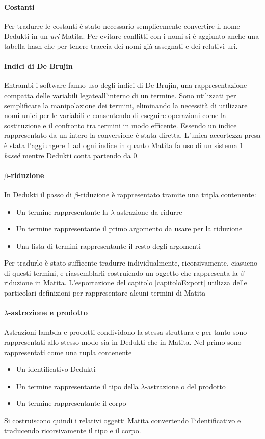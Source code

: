 \documentclass[12pt,a4paper]{report}
\begin{document}
\paragraph{Costanti}
Per tradurre le costanti è stato necessario semplicemente convertire il nome
Dedukti in un \textit{uri} Matita. Per evitare conflitti con i nomi si è aggiunto
anche una tabella hash che per tenere traccia dei nomi già assegnati e dei 
relativi uri.

\paragraph{Indici di De Brujin}
Entrambi i software fanno uso degli indici di De Brujin, una rappresentazione
compatta delle variabili legateall'interno di un termine. Sono utilizzati per
semplificare la manipolazione dei termini, eliminando la necessità di utilizzare
nomi unici per le variabili e consentendo di eseguire operazioni come la 
sostituzione e il confronto tra termini in modo efficente. 
Essendo un indice rappresentato da un intero la conversione è stata diretta.
L'unica accortezza presa è stata l'aggiungere $1$ ad ogni indice in quanto
Matita fa uso di un sistema \textit{$1$ based} mentre Dedukti conta partendo
da $0$.

\paragraph{$\beta$-riduzione}
In Dedukti il passo di $\beta$-riduzione è rappresentato tramite una tripla
contenente: 
\begin{itemize}
  \item Un termine rappresentante la $\lambda$ astrazione da ridurre
  \item Un termine rappresentante il primo argomento da usare per la riduzione
  \item Una lista di termini rappresentante il resto degli argomenti
\end{itemize}
Per tradurlo è stato sufficente tradurre individualmente, ricorsivamente, ciasucno
di questi termini, e riassemblarli costruiendo un oggetto che rappresenta la 
$\beta$-riduzione in Matita. 
L'esportazione del capitolo \ref{capitoloExport} utilizza delle particolari
definizioni per rappresentare alcuni termini di Matita %

\paragraph{$\lambda$-astrazione e prodotto}
Astrazioni lambda e prodotti condividono la stessa struttura e per tanto sono
rappresentati allo stesso modo sia in Dedukti che in Matita.
Nel primo sono rappresentati come una tupla contenente
\begin{itemize}
  \item Un identificativo Dedukti
  \item Un termine rappresentante il tipo della $\lambda$-astrazione o del prodotto
  \item Un termine rappresentante il corpo
\end{itemize}
Si costruiscono quindi i relativi oggetti Matita convertendo l'identificativo
e traducendo ricorsivamente il tipo e il corpo.
\end{document}
